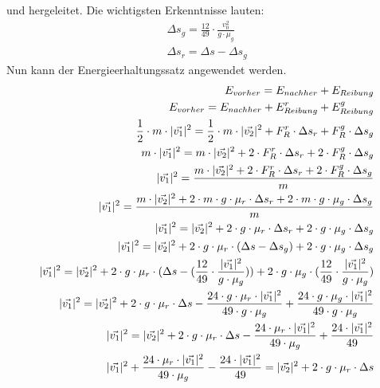 und hergeleitet. Die wichtigsten Erkenntnisse lauten:
\begin{align}
    \Delta s_g = \frac{12}{49} \cdot \frac{v_0^2}{g \cdot \mu_g}\\
    \Delta s_r = \Delta s - \Delta s_g
\end{align}
Nun kann der Energieerhaltungssatz angewendet werden.
\begin{align}
    E_{vorher} = E_{nachher} + E_{Reibung}\\
    E_{vorher} = E_{nachher} + E^r_{Reibung} + E^g_{Reibung}\\
    \frac{1}{2} \cdot m \cdot \norm{\vec{v_1}}^2 = \frac{1}{2} \cdot m \cdot \norm{\vec{v_2}}^2 + F^r_R \cdot \Delta s_r + F^g_R \cdot \Delta s_g\\
    m \cdot \norm{\vec{v_1}}^2 = m \cdot \norm{\vec{v_2}}^2 + 2 \cdot F^r_R \cdot \Delta s_r + 2 \cdot F^g_R \cdot \Delta s_g\\
    \norm{\vec{v_1}}^2 = \frac{m \cdot \norm{\vec{v_2}}^2 + 2 \cdot F^r_R \cdot \Delta s_r + 2 \cdot F^g_R \cdot \Delta s_g}{m}\\
    \norm{\vec{v_1}}^2 = \frac{m \cdot \norm{\vec{v_2}}^2 + 2 \cdot m \cdot g \cdot \mu_r \cdot \Delta s_r + 2 \cdot m \cdot g \cdot \mu_g \cdot \Delta s_g}{m}\\
    \norm{\vec{v_1}}^2 = \norm{\vec{v_2}}^2 + 2 \cdot g \cdot \mu_r \cdot \Delta s_r + 2 \cdot g \cdot \mu_g \cdot \Delta s_g\\
    \norm{\vec{v_1}}^2 = \norm{\vec{v_2}}^2 + 2 \cdot g \cdot \mu_r \cdot (\Delta s - \Delta s_g) + 2 \cdot g \cdot \mu_g \cdot \Delta s_g\\
    \norm{\vec{v_1}}^2 = \norm{\vec{v_2}}^2 + 2 \cdot g \cdot \mu_r \cdot (\Delta s - (\frac{12}{49} \cdot \frac{\norm{\vec{v_1}}^2}{g \cdot \mu_g})) + 2 \cdot g \cdot \mu_g \cdot (\frac{12}{49} \cdot \frac{\norm{\vec{v_1}}^2}{g \cdot \mu_g})\\
    \norm{\vec{v_1}}^2 = \norm{\vec{v_2}}^2 + 2 \cdot g \cdot \mu_r \cdot \Delta s - \frac{24 \cdot g \cdot \mu_r \cdot \norm{\vec{v_1}}^2}{49 \cdot g \cdot \mu_g} + \frac{24 \cdot g \cdot \mu_g \cdot \norm{\vec{v_1}}^2}{49 \cdot g \cdot \mu_g}\\
    \norm{\vec{v_1}}^2 = \norm{\vec{v_2}}^2 + 2 \cdot g \cdot \mu_r \cdot \Delta s - \frac{24 \cdot \mu_r \cdot \norm{\vec{v_1}}^2}{49 \cdot \mu_g} + \frac{24 \cdot \norm{\vec{v_1}}^2}{49}\\
    \norm{\vec{v_1}}^2 +  \frac{24 \cdot \mu_r \cdot \norm{\vec{v_1}}^2}{49 \cdot \mu_g} - \frac{24 \cdot \norm{\vec{v_1}}^2}{49}= \norm{\vec{v_2}}^2 + 2 \cdot g \cdot \mu_r \cdot \Delta s\\

\end{align}
